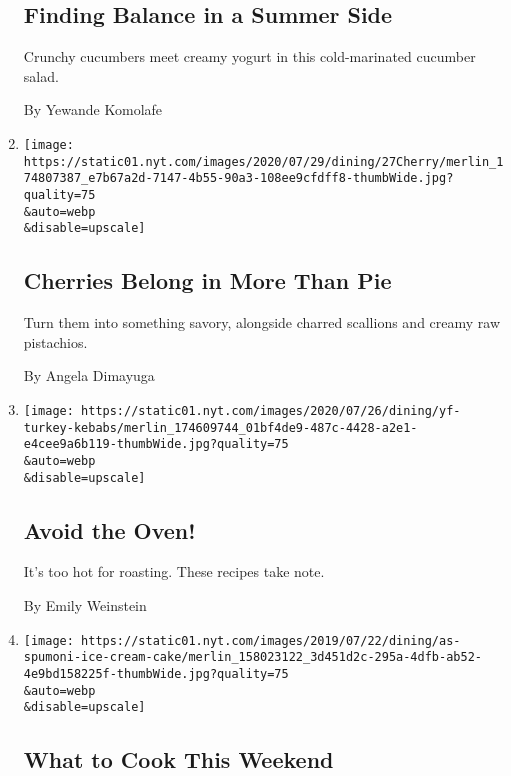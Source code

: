 \begin{enumerate}
{  \subsection{Finding Balance in a Summer
  Side}\label{finding-balance-in-a-summer-side}}

  Crunchy cucumbers meet creamy yogurt in this cold-marinated cucumber
  salad.

  By Yewande Komolafe
\item
  \href{/2020/07/24/dining/cherry-salad-recipe.html}{}

  \texttt{[image: https://static01.nyt.com/images/2020/07/29/dining/27Cherry/merlin\_174807387\_e7b67a2d-7147-4b55-90a3-108ee9cfdff8-thumbWide.jpg?quality=75\\\&auto=webp\\\&disable=upscale]}

  \hypertarget{cherries-belong-in-more-than-pie}{%
  \subsection{Cherries Belong in More Than
  Pie}\label{cherries-belong-in-more-than-pie}}

  Turn them into something savory, alongside charred scallions and
  creamy raw pistachios.

  By Angela Dimayuga
\item
  \href{/2020/07/24/dining/avoid-the-oven.html}{}

  \texttt{[image: https://static01.nyt.com/images/2020/07/26/dining/yf-turkey-kebabs/merlin\_174609744\_01bf4de9-487c-4428-a2e1-e4cee9a6b119-thumbWide.jpg?quality=75\\\&auto=webp\\\&disable=upscale]}

  \hypertarget{avoid-the-oven}{%
  \subsection{Avoid the Oven!}\label{avoid-the-oven}}

  It's too hot for roasting. These recipes take note.

  By Emily Weinstein
\item
  \href{/2020/07/24/dining/what-to-cook-this-weekend.html}{}

  \texttt{[image: https://static01.nyt.com/images/2019/07/22/dining/as-spumoni-ice-cream-cake/merlin\_158023122\_3d451d2c-295a-4dfb-ab52-4e9bd158225f-thumbWide.jpg?quality=75\\\&auto=webp\\\&disable=upscale]}

  \hypertarget{what-to-cook-this-weekend-1}{%
  \subsection{What to Cook This
  Weekend}\label{what-to-cook-this-weekend-1}}


\end{enumerate}
